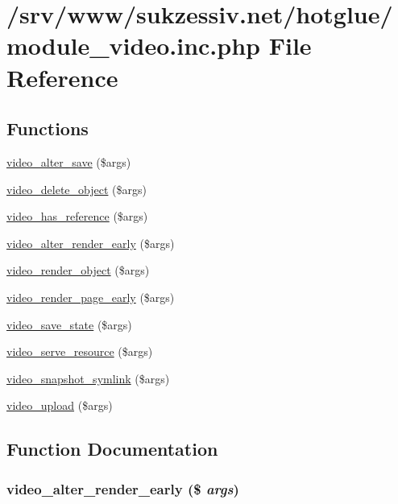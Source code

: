 \hypertarget{module__video_8inc_8php}{
\section{/srv/www/sukzessiv.net/hotglue/module\_\-video.inc.php File Reference}
\label{module__video_8inc_8php}
}
\subsection*{Functions}
\begin{CompactItemize}
\item 
\hyperlink{module__video_8inc_8php_0e3433d55c8d20b28c95a757740982e1}{video\_\-alter\_\-save} (\$args)
\item 
\hyperlink{module__video_8inc_8php_4d25a132251840ed2ade27b636a6694e}{video\_\-delete\_\-object} (\$args)
\item 
\hyperlink{module__video_8inc_8php_dbbede5e492ca7b9457deaf076c887b0}{video\_\-has\_\-reference} (\$args)
\item 
\hyperlink{module__video_8inc_8php_cb94c1f22db7bb3aada14237fa83f4dd}{video\_\-alter\_\-render\_\-early} (\$args)
\item 
\hyperlink{module__video_8inc_8php_14d6bc200a41905ad201a24d9a2d9be5}{video\_\-render\_\-object} (\$args)
\item 
\hyperlink{module__video_8inc_8php_223ac9bac4acfb2c9b458b43e45e06e3}{video\_\-render\_\-page\_\-early} (\$args)
\item 
\hyperlink{module__video_8inc_8php_828b4f740b870b886936a22baf97418e}{video\_\-save\_\-state} (\$args)
\item 
\hyperlink{module__video_8inc_8php_5af838d3c4206bbc9bc3b5e57b16655c}{video\_\-serve\_\-resource} (\$args)
\item 
\hyperlink{module__video_8inc_8php_53066561348413ee1021d257ae724983}{video\_\-snapshot\_\-symlink} (\$args)
\item 
\hyperlink{module__video_8inc_8php_6ab50ffd184d8dcf84a9783dd6a2f80e}{video\_\-upload} (\$args)
\end{CompactItemize}


\subsection{Function Documentation}
\hypertarget{module__video_8inc_8php_cb94c1f22db7bb3aada14237fa83f4dd}{
\subsubsection[{video\_\-alter\_\-render\_\-early}]{\setlength{\rightskip}{0pt plus 5cm}video\_\-alter\_\-render\_\-early (\$ {\em args})}}
\label{module__video_8inc_8php_cb94c1f22db7bb3aada14237fa83f4dd}



